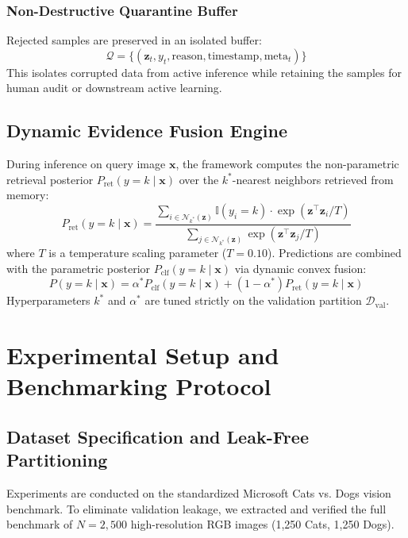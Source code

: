 \documentclass[sn-mathphys,Numbered]{sn-jnl}
\begin{document}
\subsubsection{Non-Destructive Quarantine Buffer}
Rejected samples are preserved in an isolated buffer:
\begin{equation}
\mathcal{Q} = \{(\mathbf{z}_t, y_t, \text{reason}, \text{timestamp}, \text{meta}_t)\}
\label{eq:quarantine}
\end{equation}
This isolates corrupted data from active inference while retaining the samples for human audit or downstream active learning.

\subsection{Dynamic Evidence Fusion Engine}
During inference on query image $\mathbf{x}$, the framework computes the non-parametric retrieval posterior $P_{\text{ret}}(y=k \mid \mathbf{x})$ over the $k^*$-nearest neighbors retrieved from memory:
\begin{equation}
P_{\text{ret}}(y=k \mid \mathbf{x}) = \frac{\sum_{i \in \mathcal{N}_{k^*}(\mathbf{z})} \mathbb{I}(y_i = k) \cdot \exp\left(\mathbf{z}^\top \mathbf{z}_i / T\right)}{\sum_{j \in \mathcal{N}_{k^*}(\mathbf{z})} \exp\left(\mathbf{z}^\top \mathbf{z}_j / T\right)}
\label{eq:ret_posterior}
\end{equation}
where $T$ is a temperature scaling parameter ($T=0.10$). Predictions are combined with the parametric posterior $P_{\text{clf}}(y=k \mid \mathbf{x})$ via dynamic convex fusion:
\begin{equation}
P(y = k \mid \mathbf{x}) = \alpha^* P_{\text{clf}}(y = k \mid \mathbf{x}) + (1 - \alpha^*) P_{\text{ret}}(y = k \mid \mathbf{x})
\label{eq:evidence_fusion}
\end{equation}
Hyperparameters $k^*$ and $\alpha^*$ are tuned strictly on the validation partition $\mathcal{D}_{\text{val}}$.


\section{Experimental Setup and Benchmarking Protocol}\label{sec:experiments}

\subsection{Dataset Specification and Leak-Free Partitioning}
Experiments are conducted on the standardized Microsoft Cats vs. Dogs vision benchmark. To eliminate validation leakage, we extracted and verified the full benchmark of $N=2,500$ high-resolution RGB images (1,250 Cats, 1,250 Dogs). 
\end{document}
